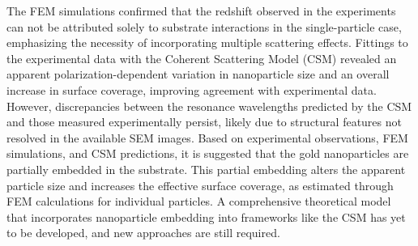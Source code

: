 The FEM simulations confirmed that the redshift observed in the experiments can not be attributed solely to substrate interactions in the single-particle case, emphasizing the necessity of incorporating multiple scattering effects. Fittings to the experimental data with the Coherent Scattering Model (CSM) revealed an apparent polarization-dependent variation in nanoparticle size and an overall increase in surface coverage, improving agreement with experimental data. However, discrepancies between the resonance wavelengths predicted by the CSM and those measured experimentally persist, likely due to structural features not resolved in the available SEM images. Based on experimental observations, FEM simulations, and CSM predictions, it is suggested that the gold nanoparticles are partially embedded in the substrate. This partial embedding alters the apparent particle size and increases the effective surface coverage, as estimated through FEM calculations for individual particles. A comprehensive theoretical model that incorporates nanoparticle embedding into frameworks like the CSM has yet to be developed, and new approaches are still required.
